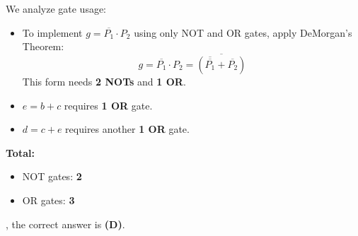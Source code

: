\documentclass[12pt]{article}
\begin{document}
We analyze gate usage:
\begin{itemize}
    \item To implement $g = \overline{P_1} \cdot P_2$ using only NOT and OR gates, apply DeMorgan’s Theorem: 
    \[
    g = \overline{P_1} \cdot P_2 = \overline{(\overline{\overline{P_1}} + \overline{P_2})}
    \]
    This form needs \textbf{2 NOTs} and \textbf{1 OR}.

    \item $e = b + c$ requires \textbf{1 OR} gate.

    \item $d = c + e$ requires another \textbf{1 OR} gate.
\end{itemize}

\textbf{Total:}
\begin{itemize}
    \item NOT gates: \textbf{2}
    \item OR gates: \textbf{3}
\end{itemize}

\textbfTherefore, the correct answer is \textbf{(D)}.
\end{document}
